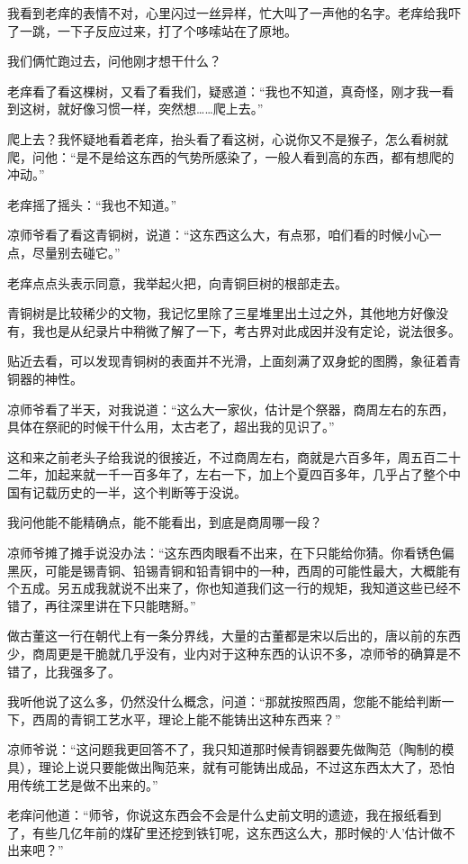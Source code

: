 我看到老痒的表情不对，心里闪过一丝异样，忙大叫了一声他的名字。老痒给我吓了一跳，一下子反应过来，打了个哆嗦站在了原地。

我们俩忙跑过去，问他刚才想干什么？

老痒看了看这棵树，又看了看我们，疑惑道：“我也不知道，真奇怪，刚才我一看到这树，就好像习惯一样，突然想……爬上去。”

爬上去？我怀疑地看着老痒，抬头看了看这树，心说你又不是猴子，怎么看树就爬，问他：“是不是给这东西的气势所感染了，一般人看到高的东西，都有想爬的冲动。”

老痒摇了摇头：“我也不知道。”

凉师爷看了看这青铜树，说道：“这东西这么大，有点邪，咱们看的时候小心一点，尽量别去碰它。”

老痒点点头表示同意，我举起火把，向青铜巨树的根部走去。

青铜树是比较稀少的文物，我记忆里除了三星堆里出土过之外，其他地方好像没有，我也是从纪录片中稍微了解了一下，考古界对此成因并没有定论，说法很多。

贴近去看，可以发现青铜树的表面并不光滑，上面刻满了双身蛇的图腾，象征着青铜器的神性。

凉师爷看了半天，对我说道：“这么大一家伙，估计是个祭器，商周左右的东西，具体在祭祀的时候干什么用，太古老了，超出我的见识了。”

这和来之前老头子给我说的很接近，不过商周左右，商就是六百多年，周五百二十二年，加起来就一千一百多年了，左右一下，加上个夏四百多年，几乎占了整个中国有记载历史的一半，这个判断等于没说。

我问他能不能精确点，能不能看出，到底是商周哪一段？

凉师爷摊了摊手说没办法：“这东西肉眼看不出来，在下只能给你猜。你看锈色偏黑灰，可能是锡青铜、铅锡青铜和铅青铜中的一种，西周的可能性最大，大概能有个五成。另五成我就说不出来了，你也知道我们这一行的规矩，我知道这些已经不错了，再往深里讲在下只能瞎掰。”

做古董这一行在朝代上有一条分界线，大量的古董都是宋以后出的，唐以前的东西少，商周更是干脆就几乎没有，业内对于这种东西的认识不多，凉师爷的确算是不错了，比我强多了。

我听他说了这么多，仍然没什么概念，问道：“那就按照西周，您能不能给判断一下，西周的青铜工艺水平，理论上能不能铸出这种东西来？”

凉师爷说：“这问题我更回答不了，我只知道那时候青铜器要先做陶范（陶制的模具），理论上说只要能做出陶范来，就有可能铸出成品，不过这东西太大了，恐怕用传统工艺是做不出来的。”

老痒问他道：“师爷，你说这东西会不会是什么史前文明的遗迹，我在报纸看到了，有些几亿年前的煤矿里还挖到铁钉呢，这东西这么大，那时候的‘人’估计做不出来吧？”

